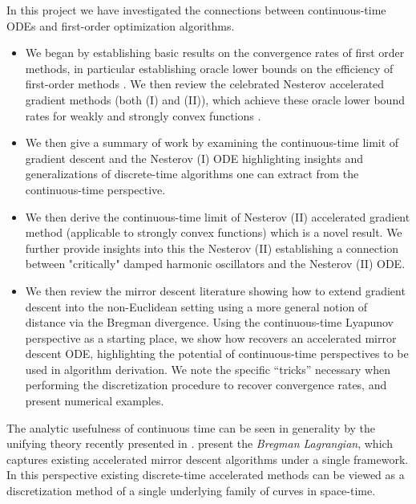 In this project we have investigated the connections between continuous-time ODEs and first-order optimization algorithms.
\begin{itemize}
\item We began by establishing basic results on the convergence rates of first order methods, in particular establishing oracle lower bounds on the efficiency of first-order methods \citep{DBLP:journals/ftml/Bubeck15}. We then review the celebrated Nesterov accelerated gradient methods (both  (I) and (II)), which achieve these oracle lower bound rates for weakly and strongly convex functions \citep{nesterov1983method,nesterov2004introductory}. 

\item We then give a summary of work by \citet{su2014differential} examining the continuous-time limit of gradient descent and the Nesterov (I) ODE highlighting insights and generalizations of discrete-time algorithms one can extract from the continuous-time perspective. 

\item We then derive the continuous-time limit of Nesterov (II) accelerated gradient method (applicable to strongly convex functions) which is a novel result. We further provide insights into this the Nesterov (II) establishing a connection between "critically" damped harmonic oscillators and the Nesterov (II) ODE.  

\item We then review the mirror descent literature showing how to extend gradient descent into the non-Euclidean setting using a more general notion of distance via the Bregman divergence. Using the continuous-time Lyapunov perspective as a starting place, we show how \citet{krichene2015accelerated} recovers an accelerated mirror descent ODE, highlighting the potential of continuous-time perspectives to be used in algorithm derivation. We note the specific ``tricks'' necessary when performing the discretization procedure to recover convergence rates, and present numerical examples.
\end{itemize}

  
The analytic usefulness of continuous time can be seen in generality by the unifying theory recently presented in \citet{wibisono2016variational}. \citet{wibisono2016variational} present the \textit{Bregman Lagrangian}, which captures existing accelerated mirror descent algorithms under a single framework. In this perspective existing discrete-time accelerated methods can be viewed as a discretization method of a single underlying family of curves in space-time. 

